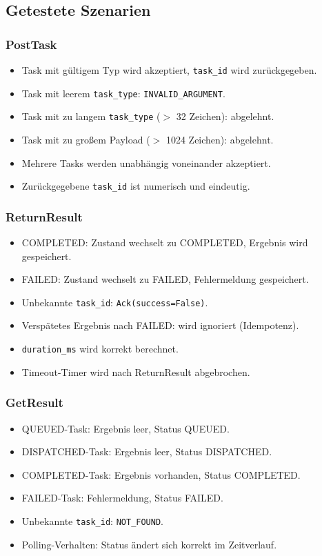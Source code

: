 \subsection{Getestete Szenarien}

\subsubsection*{PostTask}
\begin{itemize}
  \item Task mit gültigem Typ wird akzeptiert, \texttt{task\_id} wird zurückgegeben.
  \item Task mit leerem \texttt{task\_type}: \texttt{INVALID\_ARGUMENT}.
  \item Task mit zu langem \texttt{task\_type} ($>$ 32 Zeichen): abgelehnt.
  \item Task mit zu großem Payload ($>$ 1024 Zeichen): abgelehnt.
  \item Mehrere Tasks werden unabhängig voneinander akzeptiert.
  \item Zurückgegebene \texttt{task\_id} ist numerisch und eindeutig.
\end{itemize}

\subsubsection*{ReturnResult}
\begin{itemize}
  \item COMPLETED: Zustand wechselt zu COMPLETED, Ergebnis wird gespeichert.
  \item FAILED: Zustand wechselt zu FAILED, Fehlermeldung gespeichert.
  \item Unbekannte \texttt{task\_id}: \texttt{Ack(success=False)}.
  \item Verspätetes Ergebnis nach FAILED: wird ignoriert (Idempotenz).
  \item \texttt{duration\_ms} wird korrekt berechnet.
  \item Timeout-Timer wird nach ReturnResult abgebrochen.
\end{itemize}

\subsubsection*{GetResult}
\begin{itemize}
  \item QUEUED-Task: Ergebnis leer, Status QUEUED.
  \item DISPATCHED-Task: Ergebnis leer, Status DISPATCHED.
  \item COMPLETED-Task: Ergebnis vorhanden, Status COMPLETED.
  \item FAILED-Task: Fehlermeldung, Status FAILED.
  \item Unbekannte \texttt{task\_id}: \texttt{NOT\_FOUND}.
  \item Polling-Verhalten: Status ändert sich korrekt im Zeitverlauf.
\end{itemize}

